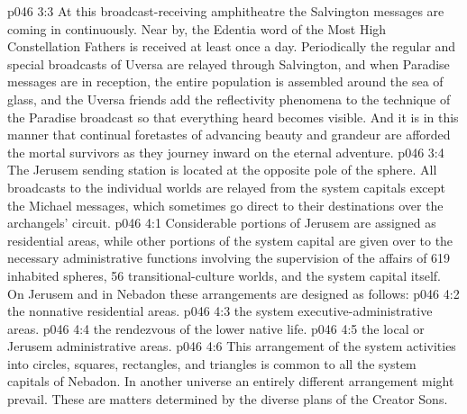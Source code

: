 \vs p046 3:3 At this broadcast\hyp{}receiving amphitheatre the Salvington messages are coming in continuously. Near by, the Edentia word of the Most High Constellation Fathers is received at least once a day. Periodically the regular and special broadcasts of Uversa are relayed through Salvington, and when Paradise messages are in reception, the entire population is assembled around the sea of glass, and the Uversa friends add the reflectivity phenomena to the technique of the Paradise broadcast so that everything heard becomes visible. And it is in this manner that continual foretastes of advancing beauty and grandeur are afforded the mortal survivors as they journey inward on the eternal adventure.
\vs p046 3:4 \pc The Jerusem sending station is located at the opposite pole of the sphere. All broadcasts to the individual worlds are relayed from the system capitals except the Michael messages, which sometimes go direct to their destinations over the archangels’ circuit.
\vs p046 4:1 Considerable portions of Jerusem are assigned as residential areas, while other portions of the system capital are given over to the necessary administrative functions involving the supervision of the affairs of 619 inhabited spheres, 56 transitional\hyp{}culture worlds, and the system capital itself. On Jerusem and in Nebadon these arrangements are designed as follows:
\vs p046 4:2 \bibnobreakspace {} the nonnative residential areas.
\vs p046 4:3 \bibnobreakspace {} the system executive\hyp{}administrative areas.
\vs p046 4:4 \bibnobreakspace {} the rendezvous of the lower native life.
\vs p046 4:5 \bibnobreakspace {} the local or Jerusem administrative areas.
\vs p046 4:6 \pc This arrangement of the system activities into circles, squares, rectangles, and triangles is common to all the system capitals of Nebadon. In another universe an entirely different arrangement might prevail. These are matters determined by the diverse plans of the Creator Sons.
